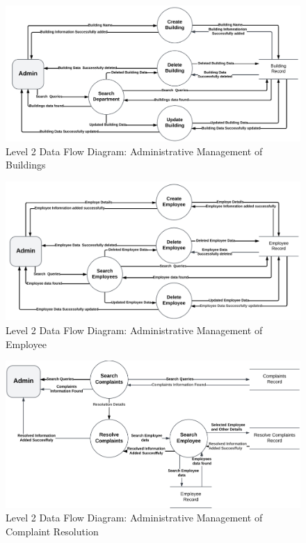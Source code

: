 \documentclass[a4paper,12pt]{article}
\begin{document}
\begin{figure}[H]
    \centering
    \includegraphics[width=1\linewidth]{photos/dfd-2-building.png}
    \caption{Level 2 Data Flow Diagram: Administrative Management of Buildings}
    \label{fig:enter-label}
\end{figure}

\begin{figure}[H]
    \centering
    \includegraphics[width=1\linewidth]{photos/dfd-2-employee.png}
    \caption{Level 2 Data Flow Diagram: Administrative Management of Employee}
    \label{fig:enter-label}
\end{figure}
\begin{figure}[H]
    \centering
    \includegraphics[width=1\linewidth]{photos/dfd-2-resolve.png}
    \caption{Level 2 Data Flow Diagram: Administrative Management of Complaint Resolution }
    \label{fig:enter-label}
\end{figure}
\end{document}
